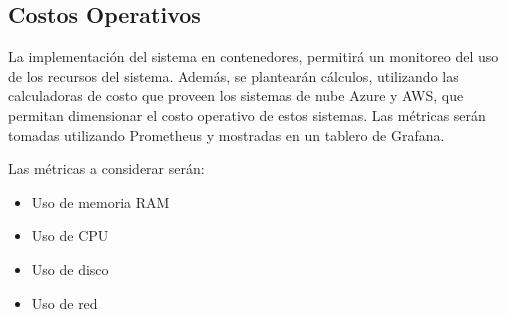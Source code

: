 \subsection{Costos Operativos}

La implementación del sistema en contenedores, permitirá un monitoreo del uso de los recursos del sistema.
Además, se plantearán cálculos, utilizando las calculadoras de costo que proveen los sistemas de nube Azure y AWS, que permitan dimensionar el costo operativo de estos sistemas.
Las métricas serán tomadas utilizando Prometheus y mostradas en un tablero de Grafana.

Las métricas a considerar serán:
\begin{itemize}
    \item Uso de memoria RAM
    \item Uso de CPU
    \item Uso de disco
    \item Uso de red
\end{itemize}